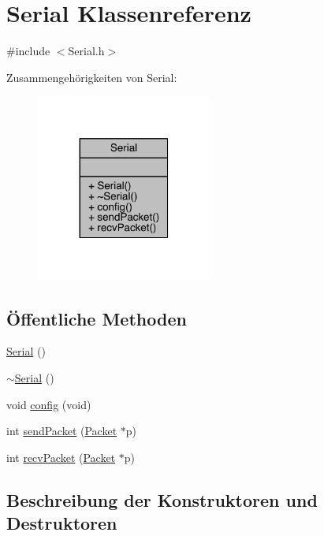 \hypertarget{class_serial}{}\section{Serial Klassenreferenz}
\label{class_serial}


{\ttfamily \#include $<$Serial.\+h$>$}



Zusammengehörigkeiten von Serial\+:\nopagebreak
\begin{figure}[H]
\begin{center}
\leavevmode
\includegraphics[width=164pt]{class_serial__coll__graph}
\end{center}
\end{figure}
\subsection*{Öffentliche Methoden}
\begin{DoxyCompactItemize}
\item 
\hyperlink{class_serial_a3667c3137f2df94716b5193f9fb736ab}{Serial} ()
\item 
\hyperlink{class_serial_a5b32c394c0ff923a4ef1c13cfb20a6ba}{$\sim$\+Serial} ()
\item 
void \hyperlink{class_serial_a50aa90466c7c87af0178cfd496da36be}{config} (void)
\item 
int \hyperlink{class_serial_a18fe9cf8fc366e6691b6ddf5e9b473a1}{send\+Packet} (\hyperlink{struct_packet}{Packet} $\ast$p)
\item 
int \hyperlink{class_serial_a357fce40e93f5a3700bfec09defd0bf9}{recv\+Packet} (\hyperlink{struct_packet}{Packet} $\ast$p)
\end{DoxyCompactItemize}


\subsection{Beschreibung der Konstruktoren und Destruktoren}
\hypertarget{class_serial_a3667c3137f2df94716b5193f9fb736ab}{}\label{class_serial_a3667c3137f2df94716b5193f9fb736ab} 
